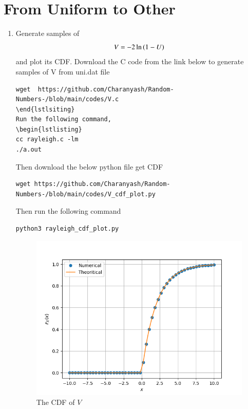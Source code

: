 \documentclass[journal,12pt,twocolumn]{IEEEtran}
\renewcommand\thesection{\arabic{section}}
\begin{document}
\section{From Uniform to Other}
\begin{enumerate}[label=\thesection.\arabic*,ref=\thesection.\theenumi]
%
\item
Generate samples of 
%
\begin{equation}
V = -2\ln\left(1-U\right)
\end{equation}
%
and plot its CDF.
\solution Download the C code from the link below to generate samples of V from uni.dat file
\begin{lstlisting}
wget  https://github.com/Charanyash/Random-Numbers-/blob/main/codes/V.c
\end{lstlsiting}
Run the following command,
\begin{lstlisting}
cc rayleigh.c -lm
./a.out
\end{lstlisting}
Then download the below python file get CDF
\begin{lstlisting}
wget https://github.com/Charanyash/Random-Numbers-/blob/main/codes/V_cdf_plot.py
\end{lstlisting}
Then run the following command
\begin{lstlisting}
python3 rayleigh_cdf_plot.py
\end{lstlisting}
\begin{figure}
\centering
\includegraphics[width=\columnwidth]{figs/V_cdf.png}
\caption{The CDF of $V$}
\label{fig:V_cdf}
\end{figure}


\end{enumerate}
\end{document}
